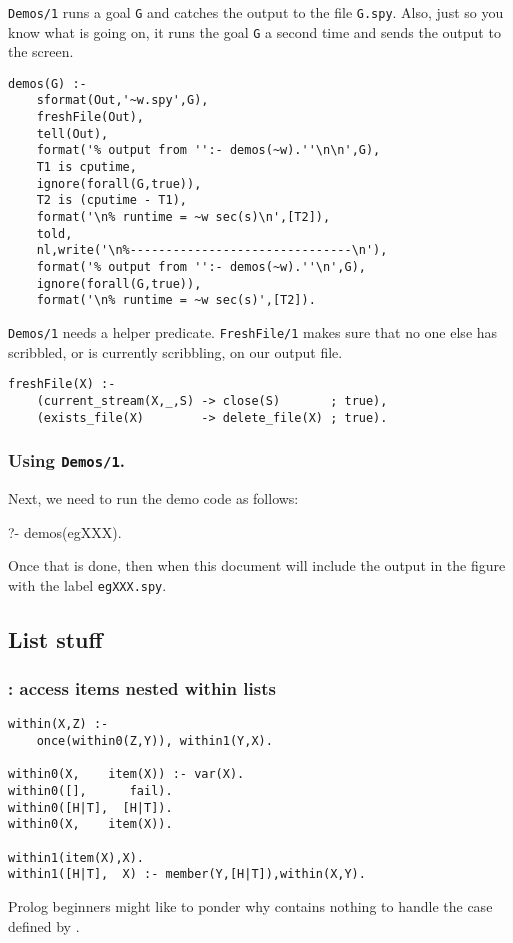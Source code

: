\subsubsection{ 
}

{\tt Demos/1} runs a goal {\tt G} and catches the output to the file
{\tt G.spy}. Also, just so you know what is going on,
it runs the goal {\tt G} a second time and sends the output to the screen. 

\begin{Verbatim}
demos(G) :-
    sformat(Out,'~w.spy',G),
    freshFile(Out),
    tell(Out),
    format('% output from '':- demos(~w).''\n\n',G),
    T1 is cputime,
    ignore(forall(G,true)),
    T2 is (cputime - T1),
    format('\n% runtime = ~w sec(s)\n',[T2]),
    told,
    nl,write('\n%-------------------------------\n'),
    format('% output from '':- demos(~w).''\n',G),  
    ignore(forall(G,true)),
    format('\n% runtime = ~w sec(s)',[T2]).
\end{Verbatim}

{\tt Demos/1} needs a helper predicate. {\tt FreshFile/1} 
makes sure that no one
else has scribbled, or is currently scribbling, on our output file.

\begin{Verbatim}
freshFile(X) :- 
    (current_stream(X,_,S) -> close(S)       ; true),
    (exists_file(X)        -> delete_file(X) ; true).
\end{Verbatim}
\subsubsection{ Using {\tt Demos/1}.
}
 Next, we need to run the demo code as follows: 
\begin{LISTING}
?- demos(egXXX).
\end{LISTING}
Once that is done, then when this document will include the
output in the figure with the label {\tt egXXX.spy}.

\subsection{ List stuff
}
\subsubsection{ : access items nested within lists
}
\begin{Verbatim}
within(X,Z) :-
	once(within0(Z,Y)), within1(Y,X).

within0(X,    item(X)) :- var(X).
within0([],      fail).
within0([H|T],  [H|T]).
within0(X,    item(X)).

within1(item(X),X).
within1([H|T],  X) :- member(Y,[H|T]),within(X,Y).
\end{Verbatim}
Prolog beginners might like to ponder why 
contains nothing to handle the  case defined by
.


